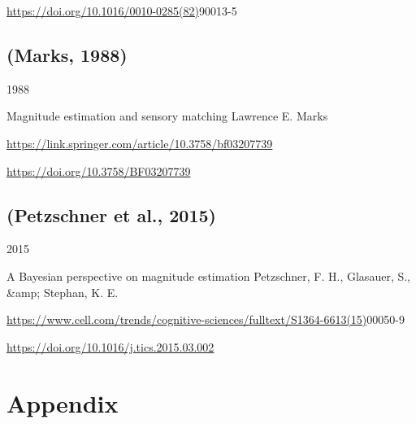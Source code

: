 \documentclass[11pt]{article}
\begin{document}
\url{https://doi.org/10.1016/0010-0285(82)}90013-5


\subsection{(Marks, 1988)}
\label{sec:orgc1844b7}

1988

Magnitude estimation and sensory matching
Lawrence E. Marks 

\url{https://link.springer.com/article/10.3758/bf03207739}


\url{https://doi.org/10.3758/BF03207739}


\subsection{(Petzschner et al., 2015)}
\label{sec:org9ec5b13}

2015

A Bayesian perspective on magnitude estimation
Petzschner, F. H., Glasauer, S., \&amp; Stephan, K. E. 

\url{https://www.cell.com/trends/cognitive-sciences/fulltext/S1364-6613(15)}00050-9

\url{https://doi.org/10.1016/j.tics.2015.03.002}

\section{Appendix}
\label{sec:orgb92f2ed}
\end{document}
